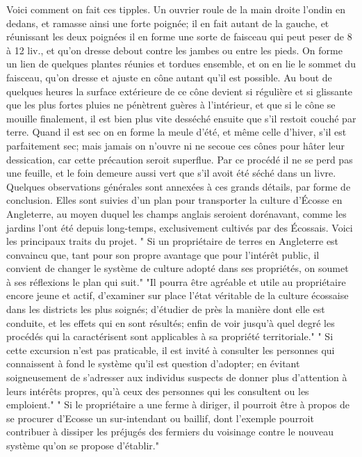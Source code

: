 Voici comment on fait ces tipples. Un ouvrier roule de la main droite l'ondin en dedans, et ramasse ainsi une forte poignée; il en fait autant de la gauche, et réunissant les deux poignées il en forme une sorte de faisceau qui peut peser de 8 à 12 liv., et qu'on dresse debout contre les jambes ou entre les pieds. On forme un lien de quelques plantes réunies et tordues ensemble, et on en lie le sommet du faisceau, qu'on dresse et ajuste en cône autant qu'il est possible. Au bout de quelques heures la surface extérieure de ce cône devient si régulière et si glissante que les plus fortes pluies ne pénètrent guères à l'intérieur, et que si le cône se mouille finalement, il est bien plus vite desséché ensuite\setcounter{page}{423} que s'il restoit couché par terre. Quand il est sec on en forme la meule d'été, et même celle d'hiver, s'il est parfaitement sec; mais jamais on n'ouvre ni ne secoue ces cônes pour hâter leur dessication, car cette précaution seroit superflue. Par ce procédé il ne se perd pas une feuille, et le foin demeure aussi vert que s'il avoit été séché dans un livre.
Quelques observations générales sont annexées à ces grands détails, par forme de conclusion. Elles sont suivies d'un plan pour transporter la culture d'Écosse en Angleterre, au moyen duquel les champs anglais seroient dorénavant, comme les jardins l'ont été depuis long-temps, exclusivement cultivés par des Écossais. Voici les principaux traits du projet.
" Si un propriétaire de terres en Angleterre est convaincu que, tant pour son propre avantage que pour l'intérêt public, il convient de changer le système de culture adopté dans ses propriétés, on soumet à ses réflexions le plan qui suit."
"Il pourra être agréable et utile au propriétaire encore jeune et actif, d'examiner sur place l'état véritable de la culture écossaise dans les districts les plus soignés; d'étudier de près la manière dont elle est conduite,\setcounter{page}{424} et les effets qui en sont résultés; enfin de voir jusqu'à quel degré les procédés qui la caractérisent sont applicables à sa propriété territoriale."
" Si cette excursion n'est pas praticable, il est invité à consulter les personnes qui connaissent à fond le système qu'il est question d'adopter; en évitant soigneusement de s'adresser aux individus suspects de donner plus d'attention à leurs intérêts propres, qu'à ceux des personnes qui les consultent ou les emploient."
" Si le propriétaire a une ferme à diriger, il pourroit être à propos de se procurer d'Ecosse un sur-intendant ou baillif, dont l'exemple pourroit contribuer à dissiper les préjugés des fermiers du voisinage contre le nouveau système qu'on se propose d'établir."
